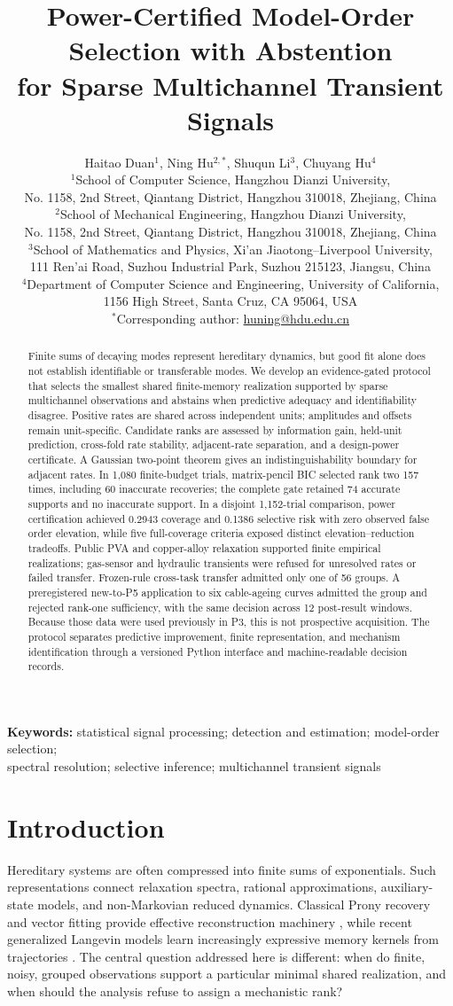 \documentclass[11pt]{article}
\title{Power-Certified Model-Order Selection with Abstention\\for Sparse Multichannel Transient Signals}
\author{Haitao Duan$^{1}$, Ning Hu$^{2,*}$, Shuqun Li$^{3}$, Chuyang Hu$^{4}$\\[2mm]
\small $^1$School of Computer Science, Hangzhou Dianzi University,\\
\small No. 1158, 2nd Street, Qiantang District, Hangzhou 310018, Zhejiang, China\\
\small $^2$School of Mechanical Engineering, Hangzhou Dianzi University,\\
\small No. 1158, 2nd Street, Qiantang District, Hangzhou 310018, Zhejiang, China\\
\small $^3$School of Mathematics and Physics, Xi'an Jiaotong--Liverpool University,\\
\small 111 Ren'ai Road, Suzhou Industrial Park, Suzhou 215123, Jiangsu, China\\
\small $^4$Department of Computer Science and Engineering, University of California,\\
\small 1156 High Street, Santa Cruz, CA 95064, USA\\[1mm]
\small $^*$Corresponding author: \href{mailto:huning@hdu.edu.cn}{huning@hdu.edu.cn}}
\date{}
\newcommand{\doublespacing}{\renewcommand{\baselinestretch}{2}\selectfont}
\begin{document}
\doublespacing
\maketitle

\begin{abstract}
Finite sums of decaying modes represent hereditary dynamics, but good fit alone does not establish identifiable or transferable modes. We develop an evidence-gated protocol that selects the smallest shared finite-memory realization supported by sparse multichannel observations and abstains when predictive adequacy and identifiability disagree. Positive rates are shared across independent units; amplitudes and offsets remain unit-specific. Candidate ranks are assessed by information gain, held-unit prediction, cross-fold rate stability, adjacent-rate separation, and a design-power certificate. A Gaussian two-point theorem gives an indistinguishability boundary for adjacent rates. In 1,080 finite-budget trials, matrix-pencil BIC selected rank two 157 times, including 60 inaccurate recoveries; the complete gate retained 74 accurate supports and no inaccurate support. In a disjoint 1,152-trial comparison, power certification achieved 0.2943 coverage and 0.1386 selective risk with zero observed false order elevation, while five full-coverage criteria exposed distinct elevation--reduction tradeoffs. Public PVA and copper-alloy relaxation supported finite empirical realizations; gas-sensor and hydraulic transients were refused for unresolved rates or failed transfer. Frozen-rule cross-task transfer admitted only one of 56 groups. A preregistered new-to-P5 application to six cable-ageing curves admitted the group and rejected rank-one sufficiency, with the same decision across 12 post-result windows. Because those data were used previously in P3, this is not prospective acquisition. The protocol separates predictive improvement, finite representation, and mechanism identification through a versioned Python interface and machine-readable decision records.
\end{abstract}

\noindent\textbf{Keywords:} statistical signal processing; detection and estimation; model-order selection;\\
spectral resolution; selective inference; multichannel transient signals

\section{Introduction}
Hereditary systems are often compressed into finite sums of exponentials. Such representations connect relaxation spectra, rational approximations, auxiliary-state models, and non-Markovian reduced dynamics. Classical Prony recovery and vector fitting provide effective reconstruction machinery \cite{stampfer2020gop,gustavsen1999vector,bosner2021parallel}, while recent generalized Langevin models learn increasingly expressive memory kernels from trajectories \cite{lei2016parameterization,ge2024state,lang2026learning}. The central question addressed here is different: when do finite, noisy, grouped observations support a particular minimal shared realization, and when should the analysis refuse to assign a mechanistic rank?
\end{document}

